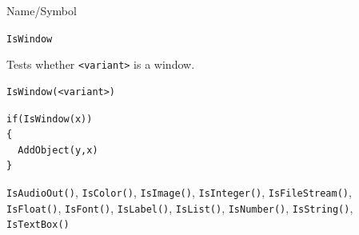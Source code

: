 \begin{desc}{Name/Symbol}
\item[Name/Symbol]	\verb+IsWindow+

\item[Description]	Tests whether \verb+<variant>+ is a window.

\item[Usage]		
\begin{verbatim}
IsWindow(<variant>)
\end{verbatim}

\item[Example]	
\begin{verbatim}
if(IsWindow(x))
{
  AddObject(y,x)
}
\end{verbatim}

\item[See Also] \verb+IsAudioOut()+, \verb+IsColor()+,
  \verb+IsImage()+, \verb+IsInteger()+, \verb+IsFileStream()+,
  \verb+IsFloat()+, \verb+IsFont()+, \verb+IsLabel()+,
  \verb+IsList()+, \verb+IsNumber()+, \verb+IsString()+,
  \verb+IsTextBox()+
\end{desc}


